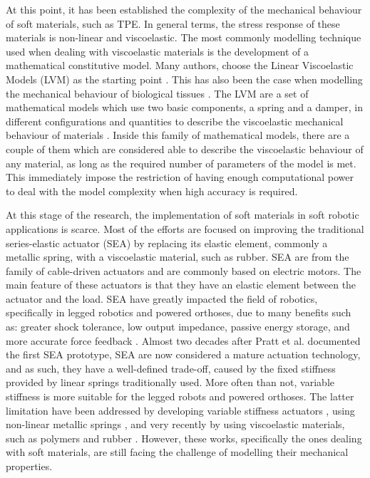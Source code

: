 At this point, it has been established the complexity of the mechanical behaviour of soft materials, such as TPE. In general terms, the stress response of these materials is non-linear and viscoelastic. The most commonly modelling technique used when dealing with viscoelastic materials is the development of a mathematical constitutive model. Many authors, choose the Linear Viscoelastic Models (LVM) as the starting point \cite{xu2014mathematical,tirella2014strain,lu2017constitutive,ciniello2017identifying}. This has also been the case when modelling the mechanical behaviour of biological tissues \cite{sanjeevi1982viscoelastic}. The LVM are a set of mathematical models which use two basic components, a spring and a damper, in different configurations and quantities to describe the viscoelastic mechanical behaviour of materials \cite{roylance2001engineering}. Inside this family of mathematical models, there are a couple of them which are considered able to describe the viscoelastic behaviour of any material, as long as the required number of parameters of the model is met. This immediately impose the restriction of having enough computational power to deal with the model complexity when high accuracy is required.

At this stage of the research, the implementation of soft materials in soft robotic applications is scarce. Most of the efforts are focused on improving the traditional series-elastic actuator (SEA) by replacing its elastic element, commonly a metallic spring, with a viscoelastic material, such as rubber. SEA are from the family of cable-driven actuators and are commonly based on electric motors. The main feature of these actuators is that they have an elastic element between the actuator and the load. SEA have greatly impacted the field of robotics, specifically in legged robotics and powered orthoses, due to many benefits such as: greater shock tolerance, low output impedance, passive energy storage, and more accurate force feedback \cite{pratt1995series,pratt2004series,au2008powered}. Almost two decades after Pratt et al. documented the first SEA prototype, SEA are now considered a mature actuation technology, and as such, they have a well-defined trade-off, caused by the fixed stiffness provided by linear springs traditionally used. More often than not, variable stiffness is more suitable for the legged robots and powered orthoses. The latter limitation have been addressed by developing variable stiffness actuators \cite{groothuis2012vsaut}, using non-linear metallic springs \cite{migliore2007novel}, and very recently by using viscoelastic materials, such as polymers and rubber \cite{rollinson2013design,parietti2011series,schepelmann2014compact}. However, these works, specifically the ones dealing with soft materials, are still facing the challenge of modelling their mechanical properties. 


